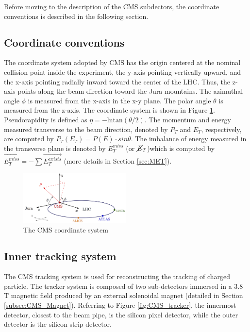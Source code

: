 Before moving to the description of the CMS subdectors, the coordinate conventions is described in the following section.
\subsection{Coordinate conventions}\label{subsec:CMS_Coordinate}

The coordinate system adopted by CMS has the origin centered at the nominal collision point inside the experiment, the y-axis pointing vertically upward, and the x-axis pointing radially inward toward the center of the LHC. Thus, the z-axis points along the beam direction toward the Jura mountains. The azimuthal angle $\phi$ is measured from the
x-axis in the x-y plane. The polar angle $\theta$ is measured from the z-axis. The coordinate system is shown in Figure \ref{fig:CMS_coordinate}. Pseudorapidity is defined as $\eta=-\mathrm{lntan}(\theta/2)$. The momentum and energy measured transverse to the beam direction, denoted by $P_{T}$ and $E_{T}$, respectively, are computed by $P_{T}(E_{T})=P(E)\cdot sin\theta$. The imbalance of energy measured in the transverse plane is denoted by $E_{T}^{miss}$ (or $\cancel{E}_T$)which is computed by $\overrightarrow{E_{T}^{miss}}=-\sum\overrightarrow{E_{T}^{exists}}$ (more details in Section \ref{sec:MET}).

\begin{figure}[h!]
\begin{center}
\includegraphics[width=0.5\textwidth]{figures/CMS/cms_coordinate_system.png}
\caption{The CMS coordinate system}
\label{fig:CMS_coordinate}
\end{center}
\end{figure}
\subsection{Inner tracking system}\label{subsec:CMS_tracker}


The CMS tracking system is used for reconstructing the tracking of charged particle. The tracker system is composed of two sub-detectors immersed in a 3.8 T magnetic field produced by an external solenoidal magnet (detailed in Section \ref{subsec:CMS_Magnet}). Referring to Figure \ref{fig:CMS_tracker}, the innermost detector, closest to the beam pipe, is the silicon pixel detector, while the outer detector is the silicon strip detector.

